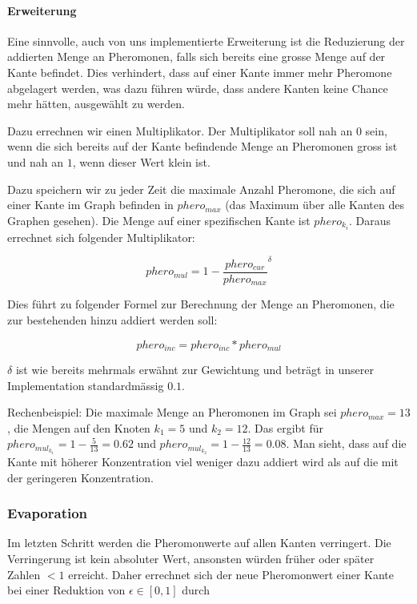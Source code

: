 \paragraph*{Erweiterung}

Eine sinnvolle, auch von uns implementierte Erweiterung ist die Reduzierung der addierten Menge an Pheromonen, falls sich bereits eine grosse Menge auf der Kante befindet. Dies verhindert, dass auf einer Kante immer mehr Pheromone abgelagert werden, was dazu führen würde, dass andere Kanten keine Chance mehr hätten, ausgewählt zu werden.

Dazu errechnen wir einen Multiplikator. Der Multiplikator soll nah an $0$ sein, wenn die sich bereits auf der Kante befindende Menge an Pheromonen gross ist und nah an $1$, wenn dieser Wert klein ist.

Dazu speichern wir zu jeder Zeit die maximale Anzahl Pheromone, die sich auf einer Kante im Graph befinden in $phero_{max}$ (das Maximum über alle Kanten des Graphen gesehen). Die Menge auf einer spezifischen Kante ist $phero_{k_i}$. Daraus errechnet sich folgender Multiplikator:

\[ phero_{mul} ={ 1 - \frac{phero_{cur}}{phero_{max}}}^\delta \]

Dies führt zu folgender Formel zur Berechnung der Menge an Pheromonen, die zur bestehenden hinzu addiert werden soll:

\[ phero_{inc} = phero_{inc} * phero_{mul} \]

$\delta$ ist wie bereits mehrmals erwähnt zur Gewichtung und beträgt in unserer Implementation standardmässig $0.1$.

Rechenbeispiel: Die maximale Menge an Pheromonen im Graph sei $phero_{max} = 13$, die Mengen auf den Knoten $k_1 = 5$ und $k_2 = 12$. Das ergibt für $phero_{mul_{k_1}} = 1 - \frac{5}{13} = 0.62$ und $phero_{mul_{k_2}} = 1 - \frac{12}{13} = 0.08$. Man sieht, dass auf die Kante mit höherer Konzentration viel weniger dazu addiert wird als auf die mit der geringeren Konzentration. 

\subsubsection*{Evaporation}

Im letzten Schritt werden die Pheromonwerte auf allen Kanten verringert. Die Verringerung ist kein absoluter Wert, ansonsten würden früher oder später Zahlen $< 1$ erreicht. Daher errechnet sich der neue Pheromonwert einer Kante bei einer Reduktion von $\epsilon \in [0, 1]$ durch

